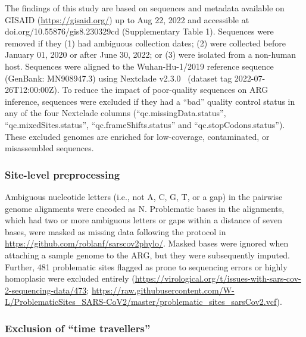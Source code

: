 \documentclass{article}
\begin{document}
The findings of this study are based on sequences and metadata available on
GISAID (\url{https://gisaid.org/}) up to Aug 22, 2022 and accessible at
doi.org/10.55876/gis8.230329cd (Supplementary Table 1).
Sequences were removed
if they (1) had ambiguous collection dates;
(2) were collected before January 01, 2020 or after June 30, 2022; or
(3) were isolated from a non-human host.
Sequences were aligned to the
Wuhan-Hu-1/2019 reference sequence (GenBank: MN908947.3)
using Nextclade v2.3.0~\citep{Aksamentov2021-hj}
(dataset tag 2022-07-26T12:00:00Z).
To reduce the impact of poor-quality sequences on ARG inference,
sequences were excluded if they had a ``bad'' quality control status
in any of the four Nextclade columns (``qc.missingData.status'',
``qc.mixedSites.status'', ``qc.frameShifts.status'' and
``qc.stopCodons.status'').
These excluded genomes are enriched for low-coverage, contaminated, or
misassembled sequences.

\subsubsection{Site-level preprocessing}

Ambiguous nucleotide letters (i.e., not A, C, G, T, or a gap) in the pairwise
genome alignments were encoded as N. Problematic bases in the alignments, which
had two or more ambiguous letters or gaps within a distance of seven bases,
were masked as missing data following the protocol in
\url{https://github.com/roblanf/sarscov2phylo/}.
Masked bases were ignored when attaching a sample genome to the ARG,
but they were subsequently imputed.
Further, 481 problematic sites flagged as prone to sequencing errors or highly
homoplasic were excluded entirely
(\url{https://virological.org/t/issues-with-sars-cov-2-sequencing-data/473};
\url{https://raw.githubusercontent.com/W-L/ProblematicSites_SARS-CoV2/master/problematic_sites_sarsCov2.vcf}).

\subsubsection{Exclusion of ``time travellers''}
\end{document}
